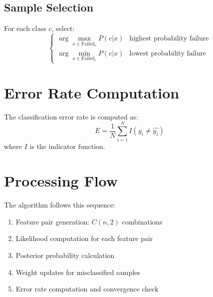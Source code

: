 \documentclass[12pt]{article}
\begin{document}
\subsection{Sample Selection}
For each class $c$, select:
\[
\begin{cases}
\arg\max_{x \in \text{Failed}_c} P(c|x) & \text{highest probability failure} \\
\arg\min_{x \in \text{Failed}_c} P(c|x) & \text{lowest probability failure}
\end{cases}
\]

\section{Error Rate Computation}
The classification error rate is computed as:
\[
E = \frac{1}{N}\sum_{i=1}^N I(y_i \neq \hat{y_i})
\]
where $I$ is the indicator function.

\section{Processing Flow}
The algorithm follows this sequence:
\begin{enumerate}
\item Feature pair generation: $C(n,2)$ combinations
\item Likelihood computation for each feature pair
\item Posterior probability calculation
\item Weight updates for misclassified samples
\item Error rate computation and convergence check
\end{enumerate}
\end{document}

